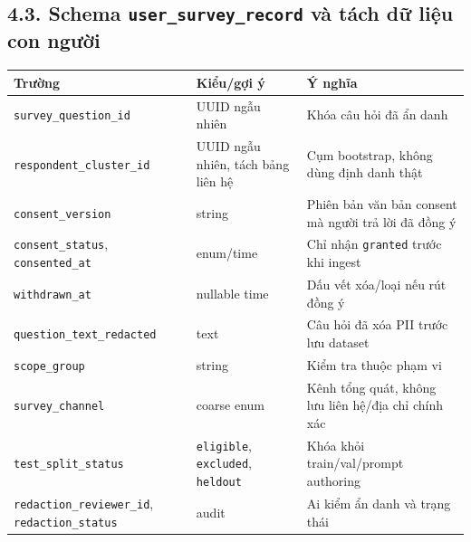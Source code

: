 \documentclass[11pt,a4paper]{article}
\begin{document}
\subsection{\texorpdfstring{4.3. Schema \nolinkurl{user_survey_record}
và tách dữ liệu con
người}{4.3. Schema  và tách dữ liệu con người}}\label{schema-user_survey_record-vuxe0-tuxe1ch-dux1eef-liux1ec7u-con-ngux1b0ux1eddi}

{\def\LTcaptype{none} %
\begin{longtable}[]{@{}
  >{\raggedright\arraybackslash}p{}
  >{\raggedright\arraybackslash}p{}
  >{\raggedright\arraybackslash}p{}@{}}
\toprule\noalign{}
\begin{minipage}[b]{\linewidth}\raggedright
Trường
\end{minipage} & \begin{minipage}[b]{\linewidth}\raggedright
Kiểu/gợi ý
\end{minipage} & \begin{minipage}[b]{\linewidth}\raggedright
Ý nghĩa
\end{minipage} \\
\midrule\noalign{}
\endhead
\bottomrule\noalign{}
\endlastfoot
\nolinkurl{survey_question_id} & UUID ngẫu nhiên & Khóa câu hỏi đã ẩn
danh \\
\nolinkurl{respondent_cluster_id} & UUID ngẫu nhiên, tách bảng liên hệ &
Cụm bootstrap, không dùng định danh thật \\
\nolinkurl{consent_version} & string & Phiên bản văn bản consent mà
người trả lời đã đồng ý \\
\nolinkurl{consent_status}, \nolinkurl{consented_at} & enum/time & Chỉ
nhận \nolinkurl{granted} trước khi ingest \\
\nolinkurl{withdrawn_at} & nullable time & Dấu vết xóa/loại nếu rút đồng
ý \\
\nolinkurl{question_text_redacted} & text & Câu hỏi đã xóa PII trước lưu
dataset \\
\nolinkurl{scope_group} & string & Kiểm tra thuộc phạm vi \\
\nolinkurl{survey_channel} & coarse enum & Kênh tổng quát, không lưu
liên hệ/địa chỉ chính xác \\
\nolinkurl{test_split_status} & \nolinkurl{eligible},
\nolinkurl{excluded}, \nolinkurl{heldout} & Khóa khỏi train/val/prompt
authoring \\
\nolinkurl{redaction_reviewer_id}, \nolinkurl{redaction_status} & audit
& Ai kiểm ẩn danh và trạng thái \\
\end{longtable}
}
\end{document}
